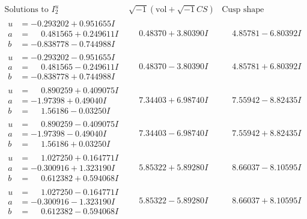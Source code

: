 \documentclass[1p]{elsarticle_modified}
\theoremstyle{definition}
\newcommand{\I}{\sqrt{-1}}
\begin{document}
$$\begin{array}{c|c|c}  
\text{Solutions to }I^u_{2}& \I (\text{vol} + \sqrt{-1}CS) & \text{Cusp shape}\\
 \hline 
\begin{aligned}
u &= -0.293202 + 0.951655 I \\
a &= \phantom{-}0.481565 + 0.249611 I \\
b &= -0.838778 - 0.744988 I\end{aligned}
 & \phantom{-}0.48370 + 3.80390 I & \phantom{-}4.85781 - 6.80392 I \\ \hline\begin{aligned}
u &= -0.293202 - 0.951655 I \\
a &= \phantom{-}0.481565 - 0.249611 I \\
b &= -0.838778 + 0.744988 I\end{aligned}
 & \phantom{-}0.48370 - 3.80390 I & \phantom{-}4.85781 + 6.80392 I \\ \hline\begin{aligned}
u &= \phantom{-}0.890259 + 0.409075 I \\
a &= -1.97398 + 0.49040 I \\
b &= \phantom{-}1.56186 - 0.03250 I\end{aligned}
 & \phantom{-}7.34403 + 6.98740 I & \phantom{-}7.55942 - 8.82435 I \\ \hline\begin{aligned}
u &= \phantom{-}0.890259 - 0.409075 I \\
a &= -1.97398 - 0.49040 I \\
b &= \phantom{-}1.56186 + 0.03250 I\end{aligned}
 & \phantom{-}7.34403 - 6.98740 I & \phantom{-}7.55942 + 8.82435 I \\ \hline\begin{aligned}
u &= \phantom{-}1.027250 + 0.164771 I \\
a &= -0.300916 + 1.323190 I \\
b &= \phantom{-}0.612382 + 0.594068 I\end{aligned}
 & \phantom{-}5.85322 + 5.89280 I & \phantom{-}8.66037 - 8.10595 I \\ \hline\begin{aligned}
u &= \phantom{-}1.027250 - 0.164771 I \\
a &= -0.300916 - 1.323190 I \\
b &= \phantom{-}0.612382 - 0.594068 I\end{aligned}
 & \phantom{-}5.85322 - 5.89280 I & \phantom{-}8.66037 + 8.10595 I \\ \hline\begin{aligned}

\end{aligned}
\end{array}$$
\end{document}
